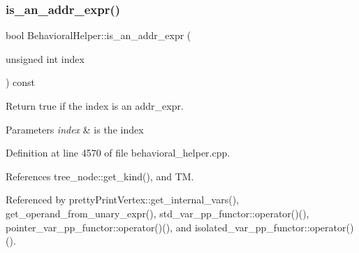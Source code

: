 \subsubsection{\texorpdfstring{is\+\_\+an\+\_\+addr\+\_\+expr()}{is\_an\_addr\_expr()}}
{\footnotesize\ttfamily bool Behavioral\+Helper\+::is\+\_\+an\+\_\+addr\+\_\+expr (\begin{DoxyParamCaption}\item[{unsigned int}]{index }\end{DoxyParamCaption}) const\hspace{0.3cm}{\ttfamily [virtual]}}



Return true if the index is an addr\+\_\+expr. 


\begin{DoxyParams}{Parameters}
{\em index} & is the index \\
\hline
\end{DoxyParams}


Definition at line 4570 of file behavioral\+\_\+helper.\+cpp.



References tree\+\_\+node\+::get\+\_\+kind(), and TM.



Referenced by pretty\+Print\+Vertex\+::get\+\_\+internal\+\_\+vars(), get\+\_\+operand\+\_\+from\+\_\+unary\+\_\+expr(), std\+\_\+var\+\_\+pp\+\_\+functor\+::operator()(), pointer\+\_\+var\+\_\+pp\+\_\+functor\+::operator()(), and isolated\+\_\+var\+\_\+pp\+\_\+functor\+::operator()().

